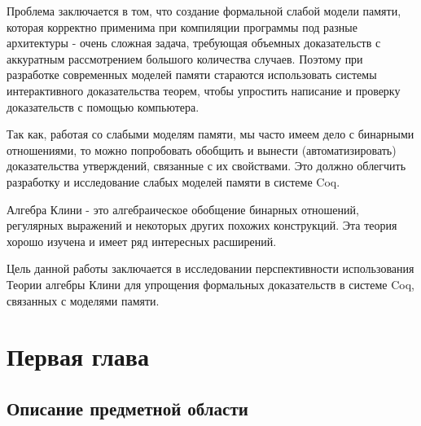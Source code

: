 \documentclass[times
              ]{itmo-student-thesis}
\begin{document}
Проблема заключается в том, что создание формальной слабой модели памяти, которая корректно применима при компиляции программы под разные архитектуры - очень сложная задача, требующая объемных доказательств с аккуратным рассмотрением большого количества случаев.
Поэтому при разработке современных моделей памяти стараются использовать системы интерактивного доказательства теорем\cite{rc11}, чтобы упростить написание и проверку доказательств с помощью компьютера.

Так как, работая со слабыми моделям памяти, мы часто имеем дело с бинарными отношениями, то можно попробовать обобщить и вынести (автоматизировать) доказательства утверждений, связанные с их свойствами.
Это должно облегчить разработку и исследование слабых моделей памяти в системе Coq.

Алгебра Клини - это алгебраическое обобщение бинарных отношений, регулярных выражений и некоторых других похожих конструкций.
Эта теория хорошо изучена и имеет ряд интересных расширений.

Цель данной работы заключается в исследовании перспективности использования Теории алгебры Клини для упрощения формальных доказательств в системе Coq, связанных с моделями памяти.

\finishrelatedwork

\chapter{Первая глава}
  \section{Описание предметной области}

\end{document}
